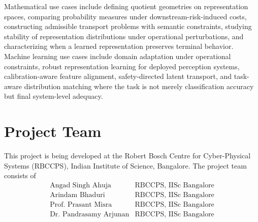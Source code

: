 \documentclass[10pt,twocolumn]{article}
\begin{document}
Mathematical use cases include defining quotient geometries on representation spaces, comparing probability measures under downstream-risk-induced costs, constructing admissible transport problems with semantic constraints, studying stability of representation distributions under operational perturbations, and characterizing when a learned representation preserves terminal behavior. Machine learning use cases include domain adaptation under operational constraints, robust representation learning for deployed perception systems, calibration-aware feature alignment, safety-directed latent transport, and task-aware distribution matching where the task is not merely classification accuracy but final system-level adequacy.

\section{Project Team}

This project is being developed at the Robert Bosch Centre for Cyber-Physical Systems (RBCCPS), Indian Institute of Science, Bangalore. The project team consists of
\[
\begin{array}{ll}
\text{Angad Singh Ahuja} & \text{RBCCPS, IISc Bangalore} \\
\text{Arindam Bhaduri} & \text{RBCCPS, IISc Bangalore} \\
\text{Prof. Prasant Misra} & \text{RBCCPS, IISc Bangalore} \\
\text{Dr. Pandrasamy Arjunan} & \text{RBCCPS, IISc Bangalore}
\end{array}
\]
\end{document}
